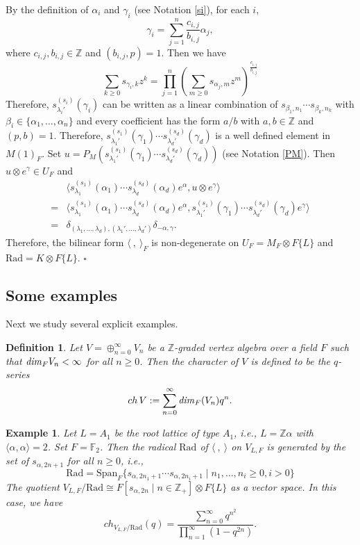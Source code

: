 \documentclass[12pt]{article}
\def\qed{{$\square$}}
\def\ZZ{{\mathbb Z}}
\def\bs{\it}            %
\def\dim{{\bs dim}}
\newtheorem{de}[thm]{Definition}
\newtheorem{ex}[thm]{Example}
\begin{document}
By the definition of  $\alpha_i$ and $\gamma_i$ (see Notation \ref{si}), for each $i$, 
\[
\gamma_i =\sum_{j=1}^n  \frac{c_{i,j}}{b_{i,j}} \alpha_j, 
\]
where $c_{i,j}, b_{i,j} \in \ZZ$ and $(b_{i,j}, p)=1$. 
Then  we have 
\[
\sum_{k\geq 0}  s_{\gamma_i,k} z^k  = \prod_{j=1}^n \left( \sum_{m\geq 0}  s_{\alpha_j,m}z^m \right)^{\frac{c_{i,j}}{b_{i,j}}}
\] 
Therefore, $s_{\lambda_i'}^{(s_i)}(\gamma_i)$ can be written as a linear combination of $s_{\beta_1, n_1}\cdots s_{\beta_k, n_k}$ with $\beta_i\in \{\alpha_1, \dots, \alpha_n\}$ and every coefficient has the form $a/b$ with $a,b\in \ZZ$ and $(p,b)=1$. 
Therefore,  $s_{\lambda_1'}^{(s_1)}(\gamma_1)\cdots s_{\lambda_d'}^{(s_d)}(\gamma_d)$ is a well defined element in $M(1)_F$. Set $u= P_M(s_{\lambda_1'}^{(s_1)}(\gamma_1)\cdots s_{\lambda_d'}^{(s_d)}(\gamma_d))$ (see Notation \ref{PM}).  Then  $u\otimes e^{\gamma}\in U_F$ and 
\[
\begin{split}
&\langle s_{\lambda_1}^{(s_1)}(\alpha_1)\cdots s_{\lambda_d}^{(s_d)}(\alpha_d)e^{\alpha}, u\otimes e^{\gamma}\rangle \\
= & 
\langle s_{\lambda_1}^{(s_1)}(\alpha_1)\cdots s_{\lambda_d}^{(s_d)}(\alpha_d)e^{\alpha}, s_{\lambda_1'}^{(s_1)}(\gamma_1)\cdots s_{\lambda_d'}^{(s_d)}(\gamma_d)e^{\gamma} 
\rangle \\
=&\delta_{(\lambda_1, \dots, \lambda_d), (\lambda_1', \dots, \lambda_d')} \delta_{-\alpha, \gamma}. 
\end{split}
\]
Therefore, the bilinear form $\langle \ ,\ \rangle_F$ is non-degenerate on $U_F=M_F \otimes F\{L\}$ and 
$\mathrm{Rad}=K\otimes F\{L\}$. 
\qed

\subsection{Some examples}
Next we study several explicit examples. 

\begin{de}
Let $V=\oplus_{n=0}^\infty V_n $ be a $\ZZ$-graded vertex algebra  over a field $F$ such that $\dim_F V_n < \infty$ for all $n\geq 0$. Then the character of $V$ is defined to be the $q$-series
\[
ch\, V:= \sum_{n=0}^\infty \dim_F(V_n) q^n.
\]
\end{de}

\begin{ex}
Let $L= A_1$ be the root lattice of type $A_1$, i.e., $L=\ZZ\alpha$ with $\langle \alpha, \alpha\rangle=2$. Set $F=\mathbb{F}_2$. 
Then the radical $\mathrm{Rad}$ of $\langle \ ,\ \rangle$ on $V_{L,F}$ is generated 
by  the set of $s_{\alpha,2n+1}$ for all $n\geq 0$, i.e., 
 \[
 \mathrm{Rad} =\mathrm{Span}_F\{ s_{\alpha,2n_1+1}\cdots s_{\alpha,2n_i+1}\mid n_1,  \dots, n_i\geq 0, i>0\}
 \]
The quotient $V_{L,F}/ \mathrm{Rad} \cong F[s_{\alpha, 2n} \mid n\in \ZZ_+] \otimes F\{L\}$ as a vector space.   
In this case, we have 
\[
ch_{V_{L,F}/ \mathrm{Rad}} (q) = \frac{\sum_{n=0}^{\infty} q^{n^2}} {\prod_{n=1}^\infty
(1-q^{2n})}. 
\] 

\end{ex}
\end{document}
